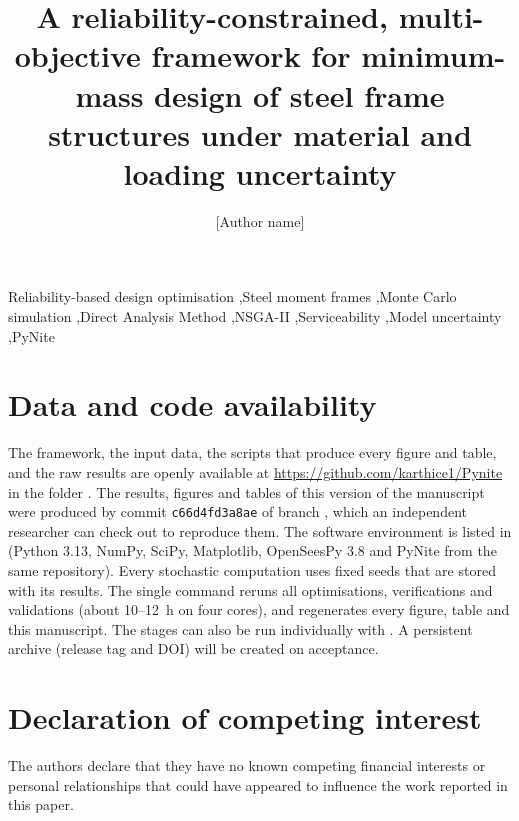\documentclass[preprint,12pt,authoryear]{elsarticle}
\newcommand{\resultscommit}{c66d4fd3a8ae}
\begin{document}
\begin{frontmatter}

\title{A reliability-constrained, multi-objective framework for minimum-mass design of steel
frame structures under material and loading uncertainty}

\author[a]{[Author name]}



\begin{keyword}
Reliability-based design optimisation \sep Steel moment frames \sep Monte Carlo simulation
\sep Direct Analysis Method \sep NSGA-II \sep Serviceability \sep Model uncertainty \sep PyNite
\end{keyword}

\end{frontmatter}




\section*{Data and code availability}
The framework, the input data, the scripts that produce every figure and table, and the raw
results are openly available at \url{https://github.com/karthice1/Pynite} in the folder
. The results, figures and tables of this version of the
manuscript were produced by commit \texttt{\resultscommit} of branch
, which an independent researcher can check out to reproduce them.
The software environment is listed in  (Python 3.13, NumPy, SciPy,
Matplotlib, OpenSeesPy 3.8 and PyNite from the same repository). Every stochastic computation uses
fixed seeds that are stored with its results. The single command  reruns all
optimisations, verifications and validations (about 10--12~h on four cores), and regenerates every
figure, table and this manuscript. The stages can also be run individually with
. A persistent archive (release tag and DOI) will be created on acceptance.

\section*{Declaration of competing interest}
The authors declare that they have no known competing financial interests or personal
relationships that could have appeared to influence the work reported in this paper.



\end{document}
